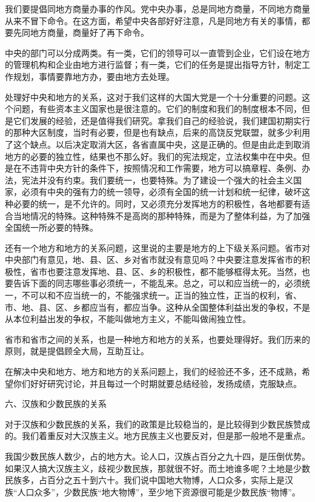\documentclass[UTF8, 12pt, a4paper]{ctexrep}
\begin{document}
我们要提倡同地方商量办事的作风。党中央办事，总是同地方商量，不同地方商量从来不冒下命令。在这方面，希望中央各部好好注意，凡是同地方有关的事情，都要先同地方商量，商量好了再下命令。

中央的部门可以分成两类。有一类，它们的领导可以一直管到企业，它们设在地方的管理机构和企业由地方进行监督；有一类，它们的任务是提出指导方针，制定工作规划，事情要靠地方办，要由地方去处理。

处理好中央和地方的关系，这对于我们这样的大国大党是一个十分重要的问题。这个问题，有些资本主义国家也是很注意的。它们的制度和我们的制度根本不同，但是它们发展的经验，还是值得我们研究。拿我们自己的经验说，我们建国初期实行的那种大区制度，当时有必要，但是也有缺点，后来的高饶反党联盟，就多少利用了这个缺点。以后决定取消大区，各省直属中央，这是正确的。但是由此走到取消地方的必要的独立性，结果也不那么好。我们的宪法规定，立法权集中在中央。但是在不违背中央方针的条件下，按照情况和工作需要，地方可以搞章程、条例、办法，宪法并没有约束。我们要统一，也要特殊。为了建设一个强大的社会主义国家，必须有中央的强有力的统一领导，必须有全国的统一计划和统一纪律，破坏这种必要的统一，是不允许的。同时，又必须充分发挥地方的积极性，各地都要有适合当地情况的特殊。这种特殊不是高岗的那种特殊，而是为了整体利益，为了加强全国统一所必要的特殊。

还有一个地方和地方的关系问题，这里说的主要是地方的上下级关系问题。省市对中央部门有意见，地、县、区、乡对省市就没有意见吗？中央要注意发挥省市的积极性，省市也要注意发挥地、县、区、乡的积极性，都不能够框得太死。当然，也要告诉下面的同志哪些事必须统一，不能乱来。总之，可以和应当统一的，必须统一，不可以和不应当统一的，不能强求统一。正当的独立性，正当的权利，省、市、地、县、区、乡都应当有，都应当争。这种从全国整体利益出发的争权，不是从本位利益出发的争权，不能叫做地方主义，不能叫做闹独立性。

省市和省市之间的关系，也是一种地方和地方的关系，也要处理得好。我们历来的原则，就是提倡顾全大局，互助互让。

在解决中央和地方、地方和地方的关系问题上，我们的经验还不多，还不成熟，希望你们好好研究讨论，并且每过一个时期就要总结经验，发扬成绩，克服缺点。

六、汉族和少数民族的关系

对于汉族和少数民族的关系，我们的政策是比较稳当的，是比较得到少数民族赞成的。我们着重反对大汉族主义。地方民族主义也要反对，但是那一般地不是重点。

我国少数民族人数少，占的地方大。论人口，汉族占百分之九十四，是压倒优势。如果汉人搞大汉族主义，歧视少数民族，那就很不好。而土地谁多呢？土地是少数民族多，占百分之五十到六十。我们说中国地大物博，人口众多，实际上是汉族“人口众多”，少数民族“地大物博”，至少地下资源很可能是少数民族“物博”。
\end{document}
